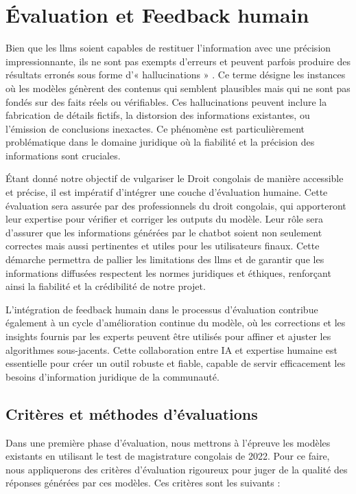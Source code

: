 
\chapter{Évaluation et Feedback humain} 
\label{ch:3}

Bien que les \acp{llm} soient capables de restituer l'information avec une précision impressionnante, ils ne sont pas exempts d'erreurs et peuvent parfois produire des résultats erronés sous forme d'« hallucinations » \cite{zhu2024understanding, bai2024hallucination}. Ce terme désigne les instances où les modèles génèrent des contenus qui semblent plausibles mais qui ne sont pas fondés sur des faits réels ou vérifiables. Ces hallucinations peuvent inclure la fabrication de détails fictifs, la distorsion des informations existantes, ou l'émission de conclusions inexactes. Ce phénomène est particulièrement problématique dans le domaine juridique où la fiabilité et la précision des informations sont cruciales.

Étant donné notre objectif de vulgariser le Droit congolais de manière accessible et précise, il est impératif d'intégrer une couche d'évaluation humaine. Cette évaluation sera assurée par des professionnels du droit congolais, qui apporteront leur expertise pour vérifier et corriger les outputs du modèle. Leur rôle sera d'assurer que les informations générées par le chatbot soient non seulement correctes mais aussi pertinentes et utiles pour les utilisateurs finaux. Cette démarche permettra de pallier les limitations des \acp{llm} et de garantir que les informations diffusées respectent les normes juridiques et éthiques, renforçant ainsi la fiabilité et la crédibilité de notre projet.

L'intégration de feedback humain dans le processus d'évaluation contribue également à un cycle d'amélioration continue du modèle, où les corrections et les insights fournis par les experts peuvent être utilisés pour affiner et ajuster les algorithmes sous-jacents. Cette collaboration entre IA et expertise humaine est essentielle pour créer un outil robuste et fiable, capable de servir efficacement les besoins d'information juridique de la communauté.

\section{Critères et méthodes d'évaluations}

Dans une première phase d'évaluation, nous mettrons à l'épreuve les modèles existants en utilisant le test de magistrature congolais de 2022. Pour ce faire, nous appliquerons des critères d'évaluation rigoureux pour juger de la qualité des réponses générées par ces modèles. Ces critères sont les suivants :

